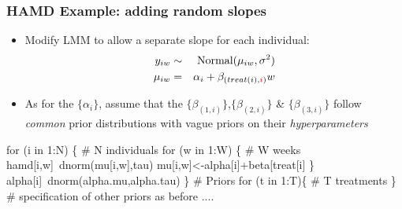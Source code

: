 \documentclass{beamer}
\begin{document}
\begin{frame}[containsverbatim]
    \frametitle{HAMD Example: adding random slopes}
    \small
    \begin{itemize}
    \item Modify LMM to allow a separate slope for each individual:
    \begin{eqnarray*}
        y_{iw} & \sim & \mbox{Normal}(\mu_{iw},\sigma^2) \\
        \mu_{iw}  & = & \alpha_i+\beta_{(treat(i),\textcolor{red}{i})}w
    \end{eqnarray*}
    \item As for the $\{\alpha_i\}$, assume that the $\{\beta_{(1,i)}\}$,$\{\beta_{(2,i)}\}$ \& $\{\beta_{(3,i)}\}$ follow \textit{common} prior distributions with vague priors on their \textit{hyperparameters}
    \end{itemize}
    \scriptsize
    \begin{ColorVerbatim}
  for (i in 1:N) \{  # N individuals
    for (w in 1:W) \{  # W weeks			
      hamd[i,w]~dnorm(mu[i,w],tau)
      mu[i,w]<-alpha[i]+beta[treat[i]\color{red}{,i}\color{black}{]*(w-1)}
    \}
    alpha[i]~dnorm(alpha.mu,alpha.tau)
  \}
  # Priors
  for (t in 1:T)\{  # T treatments	
    \color{red}{beta.mu[t]~dnorm(0,0.00001)}
    \color{red}{beta.sigma[t]~dunif(0,100)}
    \color{red}{beta.sigma.sq[t]<-pow(beta.sigma[t],2)}
    \color{red}{beta.tau[t]<-1/beta.sigma.sq[t]}
  \}	# specification of other priors as before ....							
    \end{ColorVerbatim}
    \normalsize
\end{frame}
\end{document}

